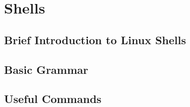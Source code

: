\chapter{Shells}

\section{Brief Introduction to Linux Shells}

\section{Basic Grammar}

\section{Useful Commands}

















